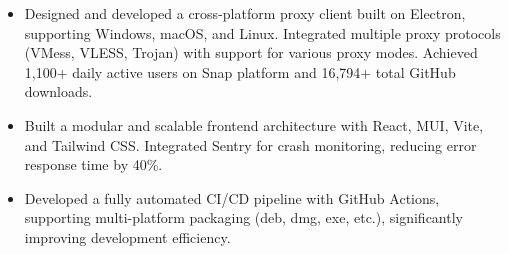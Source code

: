 \documentclass{resume}
\newcommand{\en}[1]{#1}
\newcommand{\zh}[1]{}
\begin{document}
\en{}
\zh{\datedsubsection{\textbf{\href{https://github.com/shaonhuang/V2rayX/tree/v0.4.5}{跨平台代理客户端 – V2rayX（Electron 版本）}}}{}}
\begin{itemize}
    \item \en{Designed and developed a cross-platform proxy client built on Electron, supporting Windows, macOS, and Linux. Integrated multiple proxy protocols (VMess, VLESS, Trojan) with support for various proxy modes. Achieved 1,100+ daily active users on Snap platform and 16,794+ total GitHub downloads.}
          \zh{设计并实现基于 Electron 的跨平台代理客户端，支持 Windows、macOS、Linux，集成多种代理协议（VMess、VLESS、Trojan），支持全局、PAC、规则等多种代理模式，提供节点订阅与二维码识别导入功能。Snap平台日活用户1100+，GitHub总下载数16,794+（\href{https://tooomm.github.io/github-release-stats/?username=shaonhuang&repository=V2rayX}{统计链接}）}
    \item \en{Built a modular and scalable frontend architecture with React, MUI, Vite, and Tailwind CSS. Integrated Sentry for crash monitoring, reducing error response time by 40\%.}
          \zh{使用 React、MUI、Vite 和 Tailwind 构建前端架构，模块化设计，便于维护和扩展。集成 Sentry 实现 Crash 监控，错误响应时间缩短 40\%。}
    \item \en{Developed a fully automated CI/CD pipeline with GitHub Actions, supporting multi-platform packaging (deb, dmg, exe, etc.), significantly improving development efficiency.}
          \zh{构建 GitHub Actions CI/CD 流水线，自动构建多平台安装包（deb、dmg、exe、etc），提高开发效率与交付速度。}
\end{itemize}
\end{document}
